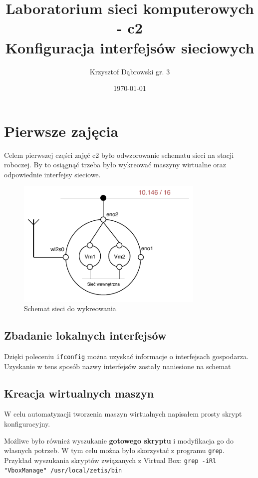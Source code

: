 \documentclass{mwart}
\title{Laboratorium sieci komputerowych - c2 \\ Konfiguracja interfejsów sieciowych}
\author{Krzysztof Dąbrowski gr. 3}
\date{\today}
\begin{document}
\maketitle{}
\tableofcontents{}

\section{Pierwsze zajęcia}
Celem pierwszej części zajęć c2 było odwzorowanie schematu sieci na stacji roboczej. By to osiągnąć trzeba było wykreować maszyny wirtualne oraz odpowiednie interfejsy sieciowe.

\begin{figure}[h]
    \includegraphics[width=0.80\textwidth]{schemat}
    \centering
    \caption{Schemat sieci do wykreowania}
    \label{fig:schemat}
\end{figure}

\subsection{Zbadanie lokalnych interfejsów}
Dzięki poleceniu \texttt{ifconfig} można uzyskać informacje o interfejsach gospodarza. Uzyskanie w tens sposób nazwy interfejsów zostały naniesione na schemat %

\subsection{Kreacja wirtualnych maszyn}
W celu automatyzacji tworzenia maszyn wirtualnych napisałem prosty skrypt konfiguracyjny.



Możliwe było również wyszukanie \textbf{gotowego skryptu} i modyfikacja go do własnych potrzeb. W tym celu można było skorzystać z programu \texttt{grep}. \\
Przykład wyszukania skryptów związanych z Virtual Box: \texttt{grep -iRl "VboxManage" /usr/local/zetis/bin}
\end{document}
